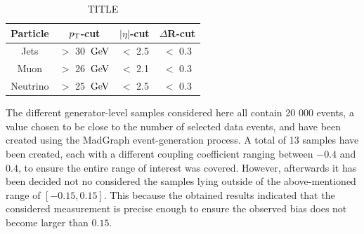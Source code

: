\begin{table}[h!t]
 \centering
 \caption{TITLE} \label{table::GenCuts}
 \begin{tabular}{c|c|c|c}
  Particle 	& $p_{\rm T}$-cut 		& $\vert \eta \vert$-cut 	& $\Delta$R-cut 	\\
  \hline
  Jets 		& $>$ 30 $\, \mathrm{GeV}$ 	& $<$ 2.5			& $<$ 0.3		\\
  Muon		& $>$ 26 $\, \mathrm{GeV}$		& $<$ 2.1			& $<$ 0.3		\\
  Neutrino 	& $>$ 25 $\, \mathrm{GeV}$		& $<$ 2.5			& $<$ 0.3		
 \end{tabular}
\end{table}

The different generator-level samples considered here all contain 20 000 events, a value chosen to be close to the number of selected data events, and have been created using the MadGraph event-generation process. A total of 13 samples have been created, each with a different coupling coefficient ranging between $-0.4$ and $0.4$, to ensure the entire range of interest was covered. 
However, afterwards it has been decided not no considered the samples lying outside of the above-mentioned range of $\left[-0.15, 0.15\right]$. This because the obtained results indicated that the considered measurement is precise enough to ensure the observed bias does not become larger than $0.15$.
\\

